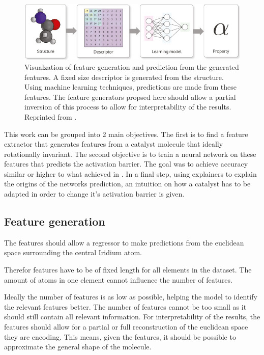 \begin{figure}
  \centering
  \includegraphics[width=12cm]{figures/introduction/chem-descriptor.jpg}
  \caption{Visualzation of feature generation and prediction from the generated features. 
  A fixed size descriptor is generated from the structure. Using machine learning techniques, 
  predictions are made from these features.
  The feature generators propsed here should allow a partial inversion of this process to allow for interpretability of the results.
  Reprinted from \cite{dscribe}.}
  \label{fig:chemspace}
\end{figure}

This work can be grouped into 2 main objectives. 
The first is to find a feature extractor that generates features from a catalyst molecule that ideally rotationally invariant.
The second objective is to train a neural network on these features that predicts the activation barrier.
The goal was to achieve accuracy similar or higher to what \citeauthor{friederich_dos} achieved in \cite{friederich_dos}.
In a final step, using explainers to explain the origins of the networks prediction, an intuition on how a catalyst has 
to be adapted in order to change it's activation barrier is given.

\subsection{Feature generation}

The features should allow a regressor to make predictions from the euclidean space surrounding the central Iridium atom.

Therefor features have to be of fixed length for all elements in the dataset.
The amount of atoms in one element cannot influence the number of features.

Ideally the number of features is as low as possible, helping the model to identify the relevant features better.
The number of features cannot be too small as it should still contain all relevant information.
For interpretability of the results, the features should allow for a partial or full reconstruction of the euclidean space they are encoding.
This means, given the features, it should be possible to approximate the general shape of the molecule.

